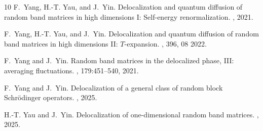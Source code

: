 \documentclass[10pt,reqno]{amsart}
\numberwithin{equation}{section}
\numberwithin{figure}{section}
\theoremstyle{plain} %
\theoremstyle{definition} %
\numberwithin{equation}{section}
\begin{document}
\begin{thebibliography}{10}
	F.~Yang, H.-T. Yau, and J.~Yin.
	\newblock Delocalization and quantum diffusion of random band matrices in high
	dimensions {I}: Self-energy renormalization.
	, 2021.
	
	F.~Yang, H.-T. Yau, and J.~Yin.
	\newblock Delocalization and quantum diffusion of random band matrices in high
	dimensions {II}: {$T$}-expansion.
	, 396, 08 2022.
	
	F.~Yang and J.~Yin.
	\newblock Random band matrices in the delocalized phase, {III}: averaging
	fluctuations.
	, 179:451--540, 2021.
	
	F.~Yang and J.~Yin.
	\newblock Delocalization of a general class of random block {S}chr\"odinger
	operators.
	, 2025.
	
	H.-T. Yau and J.~Yin.
	\newblock Delocalization of one-dimensional random band matrices.
	, 2025.
	
\end{thebibliography}
\end{document}
